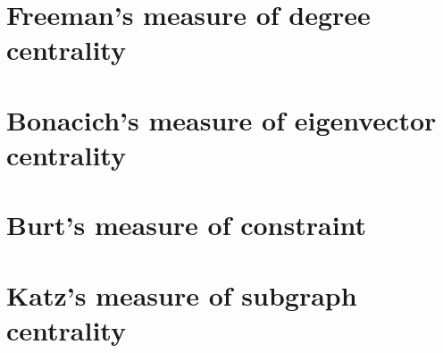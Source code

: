 
\section{Freeman's measure of degree centrality}

\section{Bonacich's measure of eigenvector centrality}

\section{Burt's measure of constraint}

\section{Katz's measure of subgraph centrality}